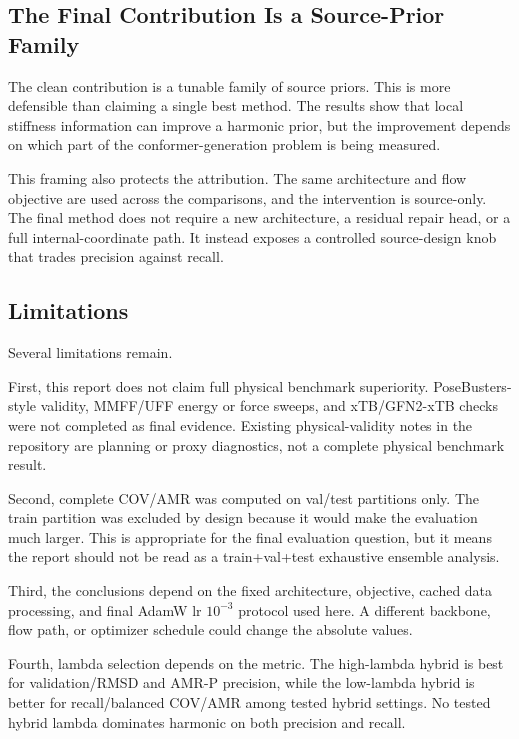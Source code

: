 \documentclass[11pt]{article}
\begin{document}
\subsection{The Final Contribution Is a Source-Prior Family}

The clean contribution is a tunable family of source priors. This is more defensible than claiming a single best method. The results show that local stiffness information can improve a harmonic prior, but the improvement depends on which part of the conformer-generation problem is being measured.

This framing also protects the attribution. The same architecture and flow objective are used across the comparisons, and the intervention is source-only. The final method does not require a new architecture, a residual repair head, or a full internal-coordinate path. It instead exposes a controlled source-design knob that trades precision against recall.

\subsection{Limitations}

Several limitations remain.

First, this report does not claim full physical benchmark superiority. PoseBusters-style validity, MMFF/UFF energy or force sweeps, and xTB/GFN2-xTB checks were not completed as final evidence. Existing physical-validity notes in the repository are planning or proxy diagnostics, not a complete physical benchmark result.

Second, complete COV/AMR was computed on val/test partitions only. The train partition was excluded by design because it would make the evaluation much larger. This is appropriate for the final evaluation question, but it means the report should not be read as a train+val+test exhaustive ensemble analysis.

Third, the conclusions depend on the fixed architecture, objective, cached data processing, and final AdamW lr $10^{-3}$ protocol used here. A different backbone, flow path, or optimizer schedule could change the absolute values.

Fourth, lambda selection depends on the metric. The high-lambda hybrid is best for validation/RMSD and AMR-P precision, while the low-lambda hybrid is better for recall/balanced COV/AMR among tested hybrid settings. No tested hybrid lambda dominates harmonic on both precision and recall.
\end{document}

